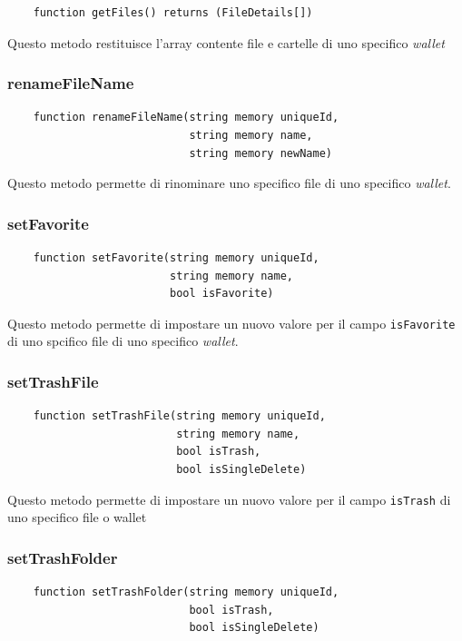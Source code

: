 \documentclass{article}
\begin{document}
\begin{lstlisting}
    function getFiles() returns (FileDetails[]) 
\end{lstlisting}

Questo metodo restituisce l'array contente file e cartelle di uno specifico \textit{wallet}

\subsubsection{renameFileName}

\begin{lstlisting}
    function renameFileName(string memory uniqueId, 
                            string memory name, 
                            string memory newName)
\end{lstlisting}

Questo metodo permette di rinominare uno specifico file di uno specifico \textit{wallet}.

\subsubsection{setFavorite}

\begin{lstlisting}
    function setFavorite(string memory uniqueId, 
                         string memory name, 
                         bool isFavorite)
\end{lstlisting}            

Questo metodo permette di impostare un nuovo valore per il campo \texttt{isFavorite} di uno spcifico file di uno specifico \textit{wallet}. 

\subsubsection{setTrashFile}

\begin{lstlisting}
    function setTrashFile(string memory uniqueId, 
                          string memory name, 
                          bool isTrash, 
                          bool isSingleDelete)
\end{lstlisting}

Questo metodo permette di impostare un nuovo valore per il campo \texttt{isTrash} di uno specifico file o wallet


\subsubsection{setTrashFolder}
\begin{lstlisting}
    function setTrashFolder(string memory uniqueId, 
                            bool isTrash, 
                            bool isSingleDelete)
\end{lstlisting}
\end{document}
